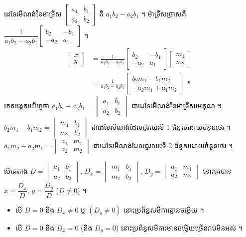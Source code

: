 \begin{example}[ឧទាហរណ៍ ១]
ដេទែរមីណង់នៃម៉ាទ្រីស $\begin{bmatrix} a_1 & b_1\\ a_2 & b_2 \end{bmatrix}$ គឺ $a_1b_2 - a_2b_1$ ។ ម៉ាទ្រីសច្រាសគឺ $\dfrac{1}{a_1b_2 - a_2b_1}\begin{bmatrix} b_2 & -b_1\\ -a_2 & a_1 \end{bmatrix}$ ។
\[
\begin{aligned}
\begin{bmatrix} x\\ y \end{bmatrix} &= \frac{1}{a_1b_2 - a_2b_1}\begin{bmatrix} b_2 & -b_1\\ -a_2 & a_1 \end{bmatrix}\begin{bmatrix} m_1\\ m_2 \end{bmatrix}\\
&= \frac{1}{a_1b_2 - a_2b_1}\begin{bmatrix} b_2m_1 - b_1m_2\\ -a_2m_1 + a_1m_2 \end{bmatrix} \text{ ។}
\end{aligned}
\]
គេសង្កេតឃើញថា $a_1b_2 - a_2b_1 = \begin{vmatrix} a_1 & b_1\\ a_2 & b_2 \end{vmatrix}$ ជាដេទែរមីណង់នៃម៉ាទ្រីសមេគុណ ។ $b_2m_1 - b_1m_2 = \begin{vmatrix} m_1 & b_1\\ m_2 & b_2 \end{vmatrix}$ ជាដេទែរមីណង់ដែលជួរឈរទី $1$ ជំនួសដោយចំនួនថេរ ។ $a_1m_2 - a_2m_1 = \begin{vmatrix} a_1 & m_1\\ a_2 & m_2 \end{vmatrix}$ ជាដេទែរមីណង់ដែលជួរឈរទី $2$ ជំនួសដោយចំនួនថេរ ។
\end{example}

\begin{formulaBox}[រូបមន្តក្រាម័រ]
បើគេតាង $D = \begin{vmatrix} a_1 & b_1\\ a_2 & b_2 \end{vmatrix}$, $D_x = \begin{vmatrix} m_1 & b_1\\ m_2 & b_2 \end{vmatrix}$, $D_y = \begin{vmatrix} a_1 & m_1\\ a_2 & m_2 \end{vmatrix}$ នោះគេបាន $x = \dfrac{D_x}{D}$, $y = \dfrac{D_y}{D}$ ($D \ne 0$) ។
\begin{itemize}
  \item បើ $D = 0$ និង $D_x \ne 0$ ឬ $(D_y \ne 0)$ នោះប្រព័ន្ធសមីការគ្មានចម្លើយ ។
  \item បើ $D = 0$ និង $D_x = 0$ (និង $D_y = 0$) នោះប្រព័ន្ធសមីការមានចម្លើយច្រើនរាប់មិនអស់ ។
\end{itemize}
\end{formulaBox}

